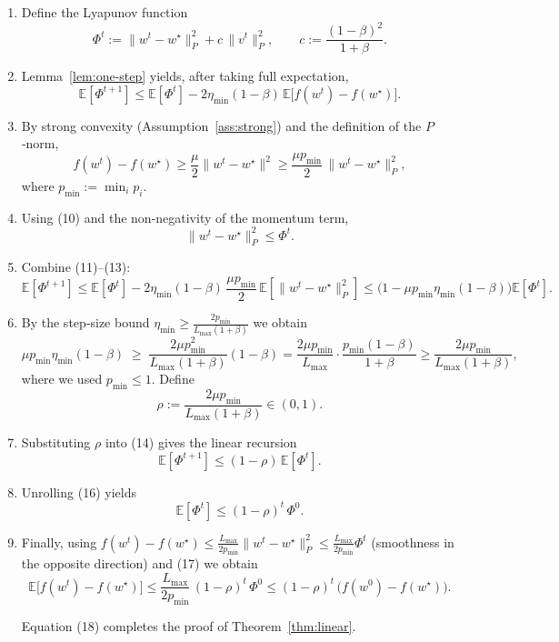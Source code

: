 \documentclass{article}
\newcommand{\E}{\mathbb{E}}
\begin{document}
\begin{enumerate}[label=[Step \arabic*],leftmargin=*]
\item Define the Lyapunov function
\[
\Phi^{t}:=\|w^{t}-w^{\star}\|_{P}^{2}+c\,\|v^{t}\|_{P}^{2},
\qquad c:=\frac{(1-\beta)^{2}}{1+\beta}.
\tag{10}
\]

\item Lemma~\ref{lem:one-step} yields, after taking full expectation,
\[
\E[\Phi^{t+1}]
\le
\E[\Phi^{t}]
-2\eta_{\min}(1-\beta)\,\E\!\bigl[f(w^{t})-f(w^{\star})\bigr].
\tag{11}
\]

\item By strong convexity (Assumption~\ref{ass:strong}) and the definition of the $P$‑norm,
\[
f(w^{t})-f(w^{\star})\ge \frac{\mu}{2}\|w^{t}-w^{\star}\|^{2}
\ge \frac{\mu p_{\min}}{2}\,\|w^{t}-w^{\star}\|_{P}^{2},
\tag{12}
\]
where $p_{\min}:=\min_i p_i$.

\item Using (10) and the non‑negativity of the momentum term,
\[
\|w^{t}-w^{\star}\|_{P}^{2}\le \Phi^{t}.
\tag{13}
\]

\item Combine (11)–(13):
\[
\E[\Phi^{t+1}]
\le
\E[\Phi^{t}]
-2\eta_{\min}(1-\beta)\,\frac{\mu p_{\min}}{2}\,\E[\|w^{t}-w^{\star}\|_{P}^{2}]
\le
\bigl(1-\mu p_{\min}\eta_{\min}(1-\beta)\bigr)\E[\Phi^{t}].
\tag{14}
\]

\item By the step‑size bound $\eta_{\min}\ge \frac{2p_{\min}}{L_{\max}(1+\beta)}$ we obtain
\[
\mu p_{\min}\eta_{\min}(1-\beta)\;\ge\;
\frac{2\mu p_{\min}^{2}}{L_{\max}(1+\beta)}(1-\beta)
 =\frac{2\mu p_{\min}}{L_{\max}}\cdot\frac{p_{\min}(1-\beta)}{1+\beta}
 \ge\frac{2\mu p_{\min}}{L_{\max}(1+\beta)},
\]
where we used $p_{\min}\le 1$.  Define
\[
\rho:=\frac{2\mu p_{\min}}{L_{\max}(1+\beta)}\in(0,1).
\tag{15}
\]

\item Substituting $\rho$ into (14) gives the linear recursion
\[
\E[\Phi^{t+1}]\le (1-\rho)\,\E[\Phi^{t}].
\tag{16}
\]

\item Unrolling (16) yields
\[
\E[\Phi^{t}]\le (1-\rho)^{t}\,\Phi^{0}.
\tag{17}
\]

\item Finally, using $f(w^{t})-f(w^{\star})\le \frac{L_{\max}}{2p_{\min}}\|w^{t}-w^{\star}\|_{P}^{2}\le
\frac{L_{\max}}{2p_{\min}}\Phi^{t}$ (smoothness in the opposite direction) and (17) we obtain
\[
\E\!\bigl[f(w^{t})-f(w^{\star})\bigr]
\le
\frac{L_{\max}}{2p_{\min}}\,(1-\rho)^{t}\,\Phi^{0}
\le
(1-\rho)^{t}\,\bigl(f(w^{0})-f(w^{\star})\bigr).
\tag{18}
\]

Equation (18) completes the proof of Theorem~\ref{thm:linear}.
\end{enumerate}
\end{document}
